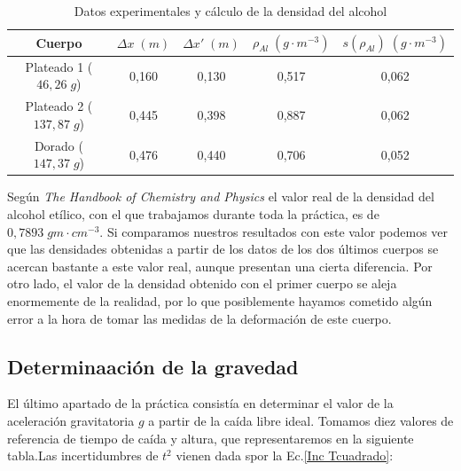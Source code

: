 \documentclass[a4paper,12pt,titlepage]{article}
\begin{document}
\begin{table}[h!]
    \centering
    \begin{tabular}{|c|c|c|c|c|}
    \hline
    Cuerpo &  $\Delta x \; (m)$ & $\Delta x' \; (m)$ & $\rho_{Al} \; (g\cdot m^{-3})$ & $s(\rho_{Al}) \; (g\cdot m^{-3})$\\ \hline
    Plateado 1 ($46,26 \; g$)& 0,160  & 0,130  & 0,517 & 0,062 \\ \hline
    Plateado 2 ($137,87 \; g$)& 0,445 & 0,398 & 0,887 & 0,062 \\ \hline
    Dorado ($147,37 \; g$) & 0,476 & 0,440  & 0,706 & 0,052 \\ \hline
    \end{tabular}
    \caption{Datos experimentales y cálculo de la densidad del alcohol}
    \label{Dens liquido}
    \end{table}

Según \textit{The Handbook of Chemistry and Physics} el valor real de la densidad del alcohol etílico, con el que trabajamos durante toda la práctica, es de $0,7893 \; gm \cdot cm^{-3}$. Si comparamos nuestros resultados con este valor podemos ver que las densidades obtenidas a partir de los datos de los dos últimos cuerpos se acercan bastante a este valor real, aunque presentan una cierta diferencia. Por otro lado, el valor de la densidad obtenido con el primer cuerpo se aleja enormemente de la realidad, por lo que posiblemente hayamos cometido algún error a la hora de tomar las medidas de la deformación de este cuerpo.

\subsection{Determinaación de la gravedad}

El último apartado de la práctica consistía en determinar el valor de la aceleración gravitatoria $g$ a partir de la caída libre ideal. Tomamos diez valores de referencia de tiempo de caída y altura, que representaremos en la siguiente tabla.Las incertidumbres de $t^2$ vienen dada spor la Ec.\ref{Inc Tcuadrado}:
\end{document}
